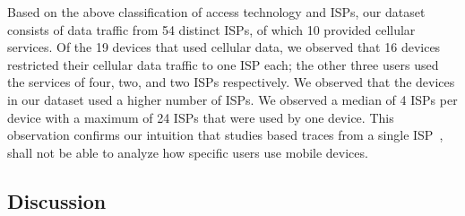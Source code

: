 Based on the above classification of access technology and ISPs, our dataset consists of data traffic from 54 distinct ISPs, of which 10 provided cellular services.
Of the 19 devices that used cellular data, we observed that 16 devices restricted their cellular data traffic to one ISP each; the other three users used the services of four, two, and two ISPs respectively.
We observed that the devices in our dataset used a higher number of \wifi ISPs.
We observed a median of 4 \wifi ISPs per device with a maximum of 24 \wifi ISPs that were used by one device.
This observation confirms our intuition that studies based traces from a single ISP~\cite{maier:mobtraffic, vallina-rod:ads}, shall not be able to analyze how specific users use mobile devices. 

\subsection{Discussion}

